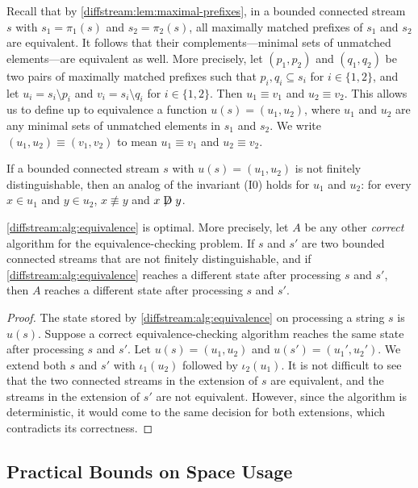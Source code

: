 Recall that by \cref{diffstream:lem:maximal-prefixes}, in a bounded connected stream $s$ with $s_1=\pi_1(s)$ and $s_2=\pi_2(s)$, all maximally matched prefixes of $s_1$
and $s_2$ are equivalent. It follows that their complements---minimal sets
of unmatched elements---are equivalent as well. More precisely, let $(p_1,p_2)$
and $(q_1,q_2)$ be two pairs of maximally matched prefixes such that
$p_i,q_i\subseteq s_i$ for $i\in\{1,2\}$, and let $u_i=s_i\setminus p_i$
and $v_i=s_i\setminus q_i$ for $i\in\{1,2\}$. Then $u_1\equiv v_1$ and
$u_2\equiv v_2$. This allows us to define up to equivalence a function
$u(s)=(u_1,u_2)$, where $u_1$ and $u_2$ are any minimal sets of unmatched elements in $s_1$ and $s_2$. We write $(u_1,u_2)\equiv (v_1,v_2)$ to mean
$u_1\equiv v_1$ and
$u_2\equiv v_2$.

If a bounded connected stream $s$ with $u(s)=(u_1,u_2)$ is not finitely
distinguishable, then an analog of the invariant (I0) holds for $u_1$ and $u_2$:
for every $x\in u_1$ and $y\in u_2$, $x\not\equiv y$ and $x\not\mathrel{\mathrm{D}} y$.

\begin{theorem}\label{diffstream:thm:optimality}
  \cref{diffstream:alg:equivalence} is optimal. More precisely,
  let $A$ be any other \emph{correct} algorithm for the equivalence-checking problem.
  If $s$ and $s'$ are two bounded connected streams that are not finitely distinguishable,
  and if \cref{diffstream:alg:equivalence} reaches a different state after processing $s$ and $s'$, then $A$ reaches a different state after processing $s$ and $s'$.
\end{theorem}

\begin{proof}
  The state stored by \cref{diffstream:alg:equivalence} on processing a string $s$ is $u(s)$.
  Suppose a correct equivalence-checking algorithm reaches the same state
  after processing $s$ and $s'$. Let $u(s)=(u_1,u_2)$ and $u(s')=(u_1',u_2')$.
  We extend both $s$ and $s'$ with $\iota_1(u_2)$ followed by $\iota_2(u_1)$.
  It is not difficult to see that the
  two connected streams in the extension of $s$
  are equivalent, and the streams in the extension of $s'$ are not equivalent.
  However, since the algorithm is deterministic, it would come to the same
  decision for both extensions, which contradicts its correctness.
\end{proof}

\subsection{Practical Bounds on Space Usage}
\label{diffstream:sec:practical-bounds}

